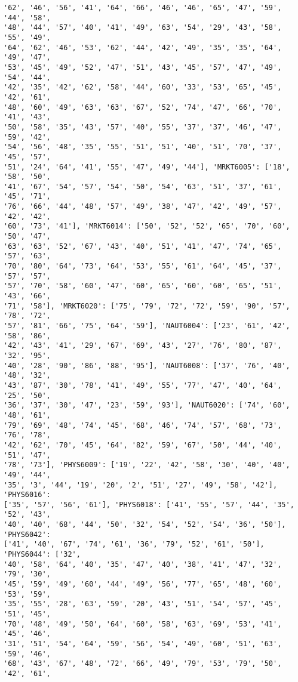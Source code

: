 \documentclass[11pt]{article}
\begin{document}
\begin{Verbatim}[commandchars=\\\{\}]
'62', '46', '56', '41', '64', '66', '46', '46', '65', '47', '59', '44', '58',
'48', '44', '57', '40', '41', '49', '63', '54', '29', '43', '58', '55', '49',
'64', '62', '46', '53', '62', '44', '42', '49', '35', '35', '64', '49', '47',
'53', '45', '49', '52', '47', '51', '43', '45', '57', '47', '49', '54', '44',
'42', '35', '42', '62', '58', '44', '60', '33', '53', '65', '45', '42', '61',
'48', '60', '49', '63', '63', '67', '52', '74', '47', '66', '70', '41', '43',
'50', '58', '35', '43', '57', '40', '55', '37', '37', '46', '47', '59', '42',
'54', '56', '48', '35', '55', '51', '51', '40', '51', '70', '37', '45', '57',
'51', '24', '64', '41', '55', '47', '49', '44'], 'MRKT6005': ['18', '58', '50',
'41', '67', '54', '57', '54', '50', '54', '63', '51', '37', '61', '45', '71',
'76', '66', '44', '48', '57', '49', '38', '47', '42', '49', '57', '42', '42',
'60', '73', '41'], 'MRKT6014': ['50', '52', '52', '65', '70', '60', '50', '47',
'63', '63', '52', '67', '43', '40', '51', '41', '47', '74', '65', '57', '63',
'70', '80', '64', '73', '64', '53', '55', '61', '64', '45', '37', '57', '57',
'57', '70', '58', '60', '47', '60', '65', '60', '60', '65', '51', '43', '66',
'71', '58'], 'MRKT6020': ['75', '79', '72', '72', '59', '90', '57', '78', '72',
'57', '81', '66', '75', '64', '59'], 'NAUT6004': ['23', '61', '42', '58', '86',
'42', '43', '41', '29', '67', '69', '43', '27', '76', '80', '87', '32', '95',
'40', '28', '90', '86', '88', '95'], 'NAUT6008': ['37', '76', '40', '48', '32',
'43', '87', '30', '78', '41', '49', '55', '77', '47', '40', '64', '25', '50',
'36', '37', '30', '47', '23', '59', '93'], 'NAUT6020': ['74', '60', '48', '61',
'79', '69', '48', '74', '45', '68', '46', '74', '57', '68', '73', '76', '78',
'42', '62', '70', '45', '64', '82', '59', '67', '50', '44', '40', '51', '47',
'78', '73'], 'PHYS6009': ['19', '22', '42', '58', '30', '40', '40', '49', '44',
'35', '3', '44', '19', '20', '2', '51', '27', '49', '58', '42'], 'PHYS6016':
['35', '57', '56', '61'], 'PHYS6018': ['41', '55', '57', '44', '35', '52', '43',
'40', '40', '68', '44', '50', '32', '54', '52', '54', '36', '50'], 'PHYS6042':
['41', '40', '67', '74', '61', '36', '79', '52', '61', '50'], 'PHYS6044': ['32',
'40', '58', '64', '40', '35', '47', '40', '38', '41', '47', '32', '79', '30',
'45', '59', '49', '60', '44', '49', '56', '77', '65', '48', '60', '53', '59',
'35', '55', '28', '63', '59', '20', '43', '51', '54', '57', '45', '51', '45',
'70', '48', '49', '50', '64', '60', '58', '63', '69', '53', '41', '45', '46',
'31', '51', '54', '64', '59', '56', '54', '49', '60', '51', '63', '59', '46',
'68', '43', '67', '48', '72', '66', '49', '79', '53', '79', '50', '42', '61',

\end{Verbatim}
\end{document}
